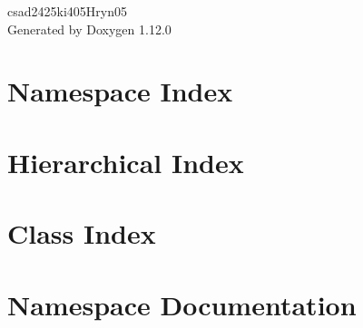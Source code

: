 \documentclass[twoside]{book}
\newcommand{\+}{\discretionary{\mbox{\scriptsize$\hookleftarrow$}}{}{}}
\newcommand{\clearemptydoublepage}{%
    \newpage{\pagestyle{empty}\cleardoublepage}%
  }
\begin{document}
  \raggedbottom
    \hypersetup{pageanchor=false,
                bookmarksnumbered=true,
                pdfencoding=unicode
               }
  \begin{titlepage}
  \vspace*{7cm}
  \begin{center}%
  {\Large csad2425ki405\+Hryn05}\\
  \vspace*{1cm}
  {\large Generated by Doxygen 1.12.0}\\
  \end{center}
  \end{titlepage}
  \clearemptydoublepage
  \tableofcontents
  \clearemptydoublepage
  \hypersetup{pageanchor=true}
\chapter{Namespace Index}

\chapter{Hierarchical Index}

\chapter{Class Index}

\chapter{Namespace Documentation}



















\end{document}
